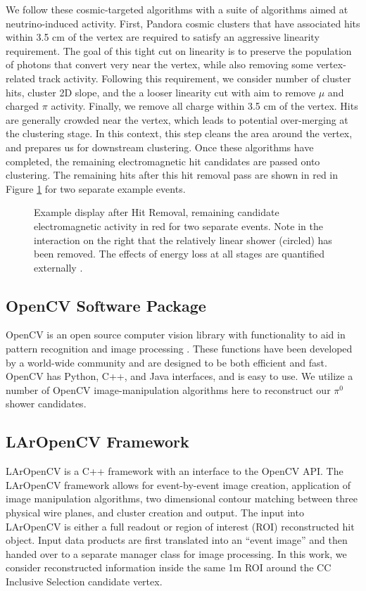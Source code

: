 \par We follow these cosmic-targeted algorithms with a suite of algorithms aimed at neutrino-induced activity. First, Pandora cosmic clusters that have associated hits within 3.5 cm of the vertex are required to satisfy an aggressive linearity requirement. The goal of this tight cut on linearity is to preserve the population of photons that convert very near the vertex, while also removing some vertex-related track activity. Following this requirement, we consider number of cluster hits, cluster 2D slope, and the a looser linearity cut with aim to remove $\mu$ and charged $\pi$ activity. Finally, we remove all charge within 3.5 cm of the vertex. Hits are generally crowded near the vertex, which leads to potential over-merging at the clustering stage. In this context, this step cleans the area around the vertex, and prepares us for downstream clustering. Once these algorithms have completed, the remaining electromagnetic hit candidates are passed onto clustering. The remaining hits after this hit removal pass are shown in red in Figure \ref{fig:hitremoval} for two separate example events. 
\begin{figure}[h!]
\centering
{}
\caption{ Example display after Hit Removal, remaining candidate electromagnetic activity in red for two separate events. Note in the interaction on the right that the relatively linear shower (circled) has been removed. The effects of energy loss at all stages are quantified externally \cite{bib:davidc_missingE}.} 
\label{fig:hitremoval}
\end{figure}

\subsection{OpenCV Software Package}
OpenCV is an open source computer vision library with functionality to aid in pattern recognition and image processing \cite{bib:opencv}. These functions have been developed by a world-wide community and are designed to be both efficient and fast. OpenCV has Python, C++, and Java interfaces, and is easy to use. We utilize a number of OpenCV image-manipulation algorithms here to reconstruct our $\pi^0$ shower candidates.  %

\subsection{LArOpenCV Framework}
LArOpenCV is a C++ framework with an interface to the OpenCV API. The LArOpenCV framework allows for event-by-event image creation, application of image manipulation algorithms, two dimensional contour matching between three physical wire planes, and cluster creation and output. The input into LArOpenCV is either a full readout or region of interest (ROI) reconstructed hit object. Input data products are first translated into an ``event image'' and then handed over to a separate manager class for image processing. In this work, we consider reconstructed information inside the same 1m ROI around the CC Inclusive Selection candidate vertex.  

